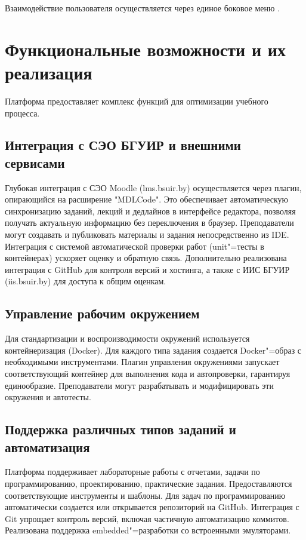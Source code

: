 \documentclass{bsuir}
\begin{document}
Взаимодействие пользователя осуществляется через единое боковое меню
.

\section{Функциональные возможности и их реализация}

Платформа предоставляет комплекс функций для оптимизации учебного процесса.

\subsection{Интеграция с СЭО БГУИР и внешними сервисами}
Глубокая интеграция с СЭО Moodle (lms.bsuir.by) осуществляется через плагин,
опирающийся на расширение "MDLCode". Это обеспечивает автоматическую
синхронизацию заданий, лекций и дедлайнов в интерфейсе редактора, позволяя
получать актуальную информацию без переключения в браузер. Преподаватели могут
создавать и публиковать материалы и задания непосредственно из IDE. Интеграция с
системой автоматической проверки работ (unit"=тесты в контейнерах) ускоряет
оценку и обратную связь. Дополнительно реализована интеграция с GitHub для
контроля версий и хостинга, а также с ИИС БГУИР (iis.bsuir.by) для доступа к
общим оценкам.

\subsection{Управление рабочим окружением}
Для стандартизации и воспроизводимости окружений используется контейнеризация
(Docker). Для каждого типа задания создается Docker"=образ с необходимыми
инструментами. Плагин управления окружениями запускает соответствующий контейнер
для выполнения кода и автопроверки, гарантируя единообразие. Преподаватели могут
разрабатывать и модифицировать эти окружения и автотесты.

\subsection{Поддержка различных типов заданий и автоматизация}
Платформа поддерживает лабораторные работы с отчетами, задачи по
программированию, проектированию, практические задания. Предоставляются
соответствующие инструменты и шаблоны. Для задач по программированию
автоматически создается или открывается репозиторий на GitHub. Интеграция с Git
упрощает контроль версий, включая частичную автоматизацию коммитов. Реализована
поддержка embedded"=разработки со встроенными эмуляторами.
\end{document}
